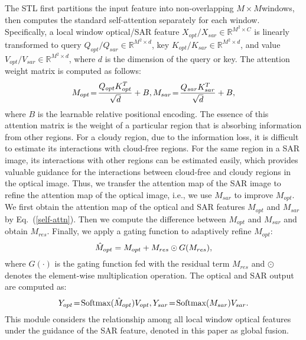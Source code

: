 \documentclass[a4paper,fleqn]{cas-dc}
\newcommand{\ie}[1]{{i.e.}}
\begin{document}
The STL first partitions the input feature into non-overlapping $M \times M$windows, then computes the standard self-attention separately for each window. Specifically, a local window optical/SAR feature $X_{opt}/X_{sar}\in\mathbb{R}^{M^2\times C}$ is linearly transformed to query $Q_{opt}/Q_{sar}\in\mathbb{R}^{M^2\times d}$, key $K_{opt}/K_{sar}\in\mathbb{R}^{M^2\times d}$, and value $V_{opt}/V_{sar}\in\mathbb{R}^{M^2\times d}$, where $d$ is the dimension of the query or key. The attention weight matrix is computed as follows: 
\begin{equation}
	\setlength{\abovedisplayskip}{4pt}	
	\setlength{\belowdisplayskip}{4pt}
	M_{opt}\!=\!\frac{Q_{opt}K_{opt}^T}{\sqrt{d}}+B, M_{sar}\!=\!\frac{Q_{sar}K_{sar}^T}{\sqrt{d}}+B,
	\label{self-attn}
\end{equation}
where $B$ is the learnable relative positional encoding. The essence of this attention matrix is the weight of a particular region that is absorbing information from other regions. For a cloudy region, due to the information loss, it is difficult to estimate its interactions with cloud-free regions. For the same region in a SAR image, its interactions with other regions can be estimated easily, which provides valuable guidance for the interactions between cloud-free and cloudy regions in the optical image. Thus, 
we transfer the attention map of the SAR image to refine the attention map of the optical image,
\ie{}, 
we use $M_{sar}$ to improve $M_{opt}$. 
We first obtain the attention map of the optical and SAR features $M_{opt}$ and $M_{sar}$ by Eq.~(\ref{self-attn}).
Then we compute the difference between $M_{opt}$ and $M_{sar}$ and obtain $M_{res}$. Finally, we apply a gating function to adaptively refine $M_{opt}$:
\begin{equation}
	\setlength{\abovedisplayskip}{4pt}	
	\setlength{\belowdisplayskip}{4pt}
	\hat{M}_{opt} = M_{opt} + M_{res}\odot G(M_{res}),
	\label{self-attn-opt-update}
\end{equation}
where $G(\cdot)$ is the gating function fed with the residual term $M_{res}$ and $\odot$ denotes the  element-wise multiplication operation. The optical and SAR output are computed as:
\begin{equation}
	\setlength{\abovedisplayskip}{4pt}	
	\setlength{\belowdisplayskip}{4pt}
	Y_{opt}\!=\!\mbox{Softmax}(\hat{M}_{opt})V_{opt},
	Y_{sar}\!=\!\mbox{Softmax}(M_{sar})V_{sar}.
	\label{self-attn-opt-output}
\end{equation}
This module considers the relationship among all local window optical features under the guidance of the SAR feature, denoted in this paper as global fusion.
\end{document}
